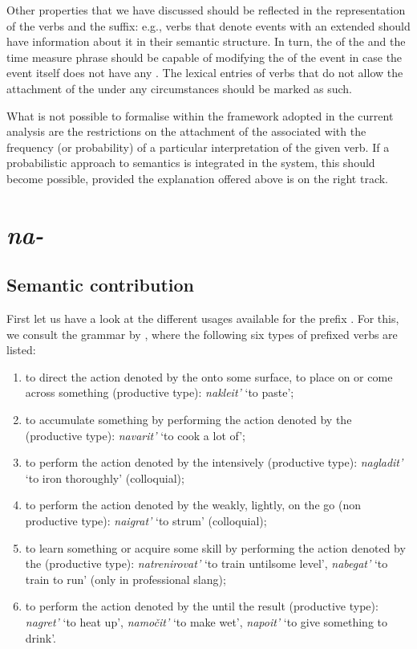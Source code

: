 Other properties that we have discussed should be reflected in the representation of the verbs and the  suffix: e.g., verbs that denote events with an extended  should have information about it in their semantic structure. In turn, the  of the  and the time measure phrase should be capable of modifying the  of the event in case the event itself does not have any . The lexical entries of verbs that do not allow the attachment of the  under any circumstances should be marked as such.

What is not possible to formalise within the framework adopted in the current analysis are the restrictions on the attachment of the  associated with the frequency (or probability) of a particular interpretation of the given verb. If a probabilistic approach to semantics is integrated in the system, this should become possible, provided the explanation offered above is on the right track.

\section{\textit{na-}}\label{subsection:semantics:na}
\subsection{Semantic contribution}
First let us have a look at the different usages available for the prefix . For this, we consult the grammar by \citet[360]{Shvedova:82}, where the following six types of prefixed verbs are listed:
\begin{enumerate}
\item to direct the action denoted by the  onto some surface, to place on or come across something (productive type): \textit{nakleit'} `to paste';
\item to accumulate something by performing the action denoted by the  (productive type): \textit{navarit'} `to cook a lot of';
\item to perform the action denoted by the  intensively (productive type): \textit{nagladit'} `to iron thoroughly' (colloquial);
\item to perform the action denoted by the  weakly, lightly, on the go (non productive type): \textit{naigrat'} `to strum' (colloquial);
\item to learn something or acquire some skill by performing the action denoted by the  (productive type): \textit{natrenirovat'} `to train until\linebreak some level', \textit{nabegat'} `to train to run' (only in professional slang);
\item to perform the action denoted by the  until the result (productive type): \textit{nagret'} `to heat up', \textit{namo\v{c}it'} `to make wet', \textit{napoit'} `to give something to drink'.
\end{enumerate}


